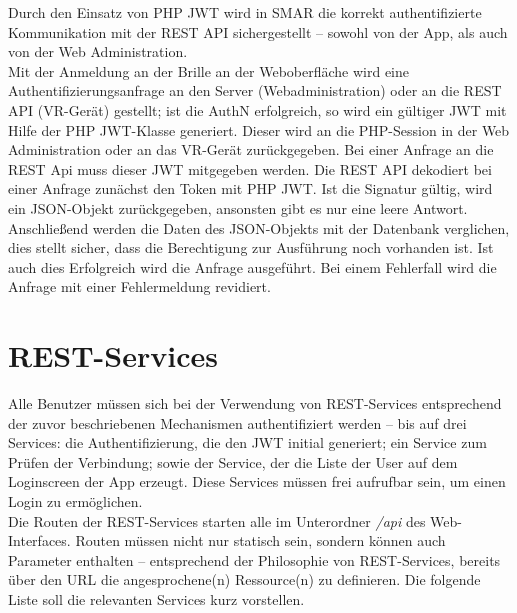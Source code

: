 Durch den Einsatz von PHP JWT wird in \ac{SMAR} die korrekt authentifizierte Kommunikation mit der \acs{REST} \acs{API} sichergestellt -- sowohl von der App, als auch von der Web Administration.\\
Mit der Anmeldung an der Brille \bzw an der Weboberfläche wird eine Authentifizierungsanfrage an den Server (Webadministration) oder an die \acs{REST} \acs{API} (\acs{VR}-Gerät) gestellt; ist die \acl{AuthN} erfolgreich, so wird ein gültiger \ac{JWT} mit Hilfe der PHP JWT-Klasse generiert. Dieser wird an die PHP-Session in der Web Administration oder an das \acs{VR}-Gerät zurückgegeben. Bei einer Anfrage an die REST Api muss dieser \acs{JWT} mitgegeben werden. Die \acs{REST} \acs{API} dekodiert bei einer Anfrage zunächst den Token mit PHP JWT. Ist die Signatur gültig, wird ein \acs{JSON}-Objekt zurückgegeben, ansonsten gibt es nur eine leere Antwort. Anschließend werden die Daten des \acs{JSON}-Objekts mit der Datenbank verglichen, dies stellt sicher, dass die Berechtigung zur Ausführung noch vorhanden ist. Ist auch dies Erfolgreich wird die Anfrage ausgeführt. Bei einem Fehlerfall wird die Anfrage mit einer Fehlermeldung revidiert.

\section{REST-Services}
Alle Benutzer müssen sich bei der Verwendung von REST-Services entsprechend der zuvor beschriebenen Mechanismen authentifiziert werden -- bis auf drei Services: die Authentifizierung, die den \acs{JWT} initial generiert; ein Service zum Prüfen der Verbindung; sowie der Service, der die Liste der User auf dem Loginscreen der App erzeugt. Diese Services müssen frei aufrufbar sein, um einen Login zu ermöglichen.\\
Die Routen der \acs{REST}-Services starten alle im Unterordner \emph{/api} des Web-Interfaces. Routen müssen nicht nur statisch sein, sondern können auch Parameter enthalten -- entsprechend der Philosophie von \acs{REST}-Services, bereits über den \acs{URL} die angesprochene(n) Ressource(n) zu definieren. Die folgende Liste soll die relevanten Services kurz vorstellen.

